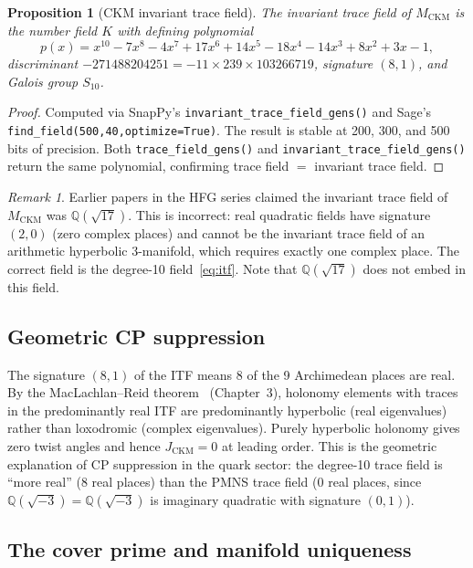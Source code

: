 \documentclass[11pt,a4paper]{article}
\newtheorem{proposition}[theorem]{Proposition}
\theoremstyle{remark}
\newtheorem{remark}[theorem]{Remark}
\newcommand{\MCKM}{M_{\mathrm{CKM}}}
\newcommand{\QQ}{\mathbb{Q}}
\begin{document}
\begin{proposition}[CKM invariant trace field]
\label{prop:itf}
The invariant trace field of $\MCKM$ is the number field $K$ with
defining polynomial
\begin{equation}
p(x) = x^{10}-7x^8-4x^7+17x^6+14x^5-18x^4-14x^3+8x^2+3x-1,
\label{eq:itf}
\end{equation}
discriminant $-271488204251 = -11\times239\times103266719$,
signature $(8,1)$, and Galois group $S_{10}$.
\end{proposition}

\begin{proof}
Computed via SnapPy's \texttt{invariant\_trace\_field\_gens()}
and Sage's \texttt{find\_field(500,40,optimize=True)}.
The result is stable at 200, 300, and 500 bits of precision.
Both \texttt{trace\_field\_gens()} and \texttt{invariant\_trace\_field\_gens()}
return the same polynomial, confirming trace field $=$ invariant
trace field.
\end{proof}

\begin{remark}
Earlier papers in the HFG series claimed the invariant trace field
of $\MCKM$ was $\QQ(\sqrt{17})$.
This is incorrect: real quadratic fields have signature $(2,0)$
(zero complex places) and cannot be the invariant trace field
of an arithmetic hyperbolic 3-manifold, which requires exactly
one complex place.
The correct field is the degree-10 field~\eqref{eq:itf}.
Note that $\QQ(\sqrt{17})$ does not embed in this field.
\end{remark}

\subsection{Geometric CP suppression}

The signature $(8,1)$ of the ITF means 8 of the 9 Archimedean
places are real.
By the MacLachlan--Reid theorem~\cite{MaclachlanReid} (Chapter~3),
holonomy elements with traces in the predominantly real ITF are
predominantly hyperbolic (real eigenvalues) rather than loxodromic
(complex eigenvalues).
Purely hyperbolic holonomy gives zero twist angles and hence
$J_{\mathrm{CKM}} = 0$ at leading order.
This is the geometric explanation of CP suppression in the quark
sector: the degree-10 trace field is ``more real'' (8 real places)
than the PMNS trace field (0 real places, since
$\mathbb{Q}(\sqrt{-3}) = \QQ(\sqrt{-3})$ is imaginary quadratic with signature $(0,1)$).

\subsection{The cover prime and manifold uniqueness}
\end{document}
